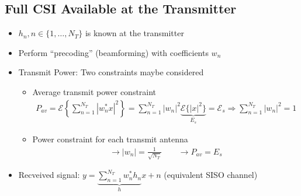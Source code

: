 \documentclass[a4paper, 10pt]{article}
\begin{document}
\subsection{Full CSI Available at the Transmitter}
\begin{itemize}
	\item $h_n, n \in \{1,\dots,N_T\}$ is known at the transmitter
	\item Perform ``precoding'' (beamforming) with coefficients $w_n$
\end{itemize}

\begin{itemize}
	\item Transmit Power: Two constraints maybe considered
	\begin{itemize}
		\item Average transmit power constraint
		\begin{align*}
		P_{av}=\mathcal{E}\left\{\sum\limits^{N_T}_{n=1}|w_n^*x|^2\right\}=\sum\limits_{n=1}^{N_T}|w_n|^2\underbrace{\mathcal{E}\{|x|^2\}}_{E_s}=\mathcal{E}_s \Rightarrow \sum\limits^{N_T}_{n=1}|w_n|^2=1
		\end{align*}
		\item Power constraint for each transmit antenna
		\begin{align*}
		\rightarrow |w_n|=\frac{1}{\sqrt{N_T}} \qquad \rightarrow P_{av}=E_s
		\end{align*}
	\end{itemize}
	\item Recveived signal: $y=\underbrace{\sum\limits^{N_T}_{n=1}w^*_nh_n}_{h}x+n$ (equivalent SISO channel)
\end{itemize}
\end{document}
